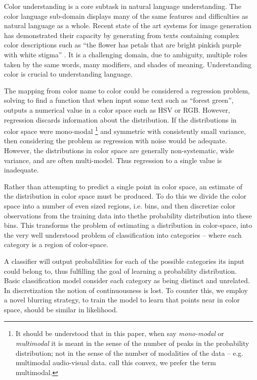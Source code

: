 \documentclass[11pt,letterpaper]{article}
\newcommand{\parencite}{\cite}
\newcommand{\textcite}{\newcite}
\begin{document}
Color understanding is a core subtask in natural language understanding.
The color language sub-domain displays many of the same features and difficulties as natural language as a whole.
Recent state of the art systems for image generation has demonstrated their capacity by generating from texts containing complex color descriptions such as ``the flower has petals that 
are bright pinkish purple with white stigma'' \parencite{reed2016generative, 2015arXiv151102793M}.
It is a challenging domain, due to ambiguity, multiple roles taken by the same words, many modifiers, and shades of meaning.
Understanding color is crucial to understanding language. 


The mapping from color name to color could be considered a regression problem, solving to find a function that when input some text such as ``forest green'', outputs a numerical value in a color space such as HSV or RGB.
However, regression discards information about the distribution.
If the distributions in color space were mono-modal
\footnote{It should be understood that in this paper, when say \emph{mono-modal} or \emph{multimodal} it is meant in the sense of the number of peaks in the probability distribution; not in the sense of the number of modalities of the data -- e.g. multimodal audio-visual data. 
\textcite{mcmahan2015bayesian} call this convex, we prefer the term multimodal.
	}
and symmetric with consistently small variance, then considering the problem as regression with noise would be adequate.
However, the distributions in color space are generally non-systematic, wide variance, and are often multi-model.
Thus regression to a single value is inadequate.
 
Rather than attempting to predict a single point in color space, an estimate of the distribution in color space must be produced.
To do this we divide the color space into a number of even sized regions, i.e.  bins, and then discretize color observations from the training data into thethe probability distribution into these bins.
This transforms the problem of estimating a distribution in color-space,
into the very well understood problem of classification into categories -- where each category is a region of color-space.

A classifier will output probabilities for each of the possible categories its input could belong to, thus fulfilling the goal of learning a probability distribution.
Basic classification model consider each category as being distinct and unrelated.
In discretization the notion of continuousness is lost.
To counter this, we employ a novel blurring strategy, to train the model to learn that points near in color space, should be similar in likelihood.
\end{document}
